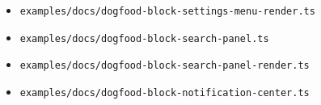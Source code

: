 \begin{itemize}
\begin{itemize}
  \item
    \texttt{e\allowbreak{}x\allowbreak{}a\allowbreak{}m\allowbreak{}p\allowbreak{}l\allowbreak{}e\allowbreak{}s\allowbreak{}/\allowbreak{}d\allowbreak{}o\allowbreak{}c\allowbreak{}s\allowbreak{}/\allowbreak{}d\allowbreak{}o\allowbreak{}g\allowbreak{}f\allowbreak{}o\allowbreak{}o\allowbreak{}d\allowbreak{}-\allowbreak{}b\allowbreak{}l\allowbreak{}o\allowbreak{}c\allowbreak{}k\allowbreak{}-\allowbreak{}s\allowbreak{}e\allowbreak{}t\allowbreak{}t\allowbreak{}i\allowbreak{}n\allowbreak{}g\allowbreak{}s\allowbreak{}-\allowbreak{}m\allowbreak{}e\allowbreak{}n\allowbreak{}u\allowbreak{}-\allowbreak{}r\allowbreak{}e\allowbreak{}n\allowbreak{}d\allowbreak{}e\allowbreak{}r\allowbreak{}.\allowbreak{}t\allowbreak{}s}
  \item
    \texttt{e\allowbreak{}x\allowbreak{}a\allowbreak{}m\allowbreak{}p\allowbreak{}l\allowbreak{}e\allowbreak{}s\allowbreak{}/\allowbreak{}d\allowbreak{}o\allowbreak{}c\allowbreak{}s\allowbreak{}/\allowbreak{}d\allowbreak{}o\allowbreak{}g\allowbreak{}f\allowbreak{}o\allowbreak{}o\allowbreak{}d\allowbreak{}-\allowbreak{}b\allowbreak{}l\allowbreak{}o\allowbreak{}c\allowbreak{}k\allowbreak{}-\allowbreak{}s\allowbreak{}e\allowbreak{}a\allowbreak{}r\allowbreak{}c\allowbreak{}h\allowbreak{}-\allowbreak{}p\allowbreak{}a\allowbreak{}n\allowbreak{}e\allowbreak{}l\allowbreak{}.\allowbreak{}t\allowbreak{}s}
  \item
    \texttt{e\allowbreak{}x\allowbreak{}a\allowbreak{}m\allowbreak{}p\allowbreak{}l\allowbreak{}e\allowbreak{}s\allowbreak{}/\allowbreak{}d\allowbreak{}o\allowbreak{}c\allowbreak{}s\allowbreak{}/\allowbreak{}d\allowbreak{}o\allowbreak{}g\allowbreak{}f\allowbreak{}o\allowbreak{}o\allowbreak{}d\allowbreak{}-\allowbreak{}b\allowbreak{}l\allowbreak{}o\allowbreak{}c\allowbreak{}k\allowbreak{}-\allowbreak{}s\allowbreak{}e\allowbreak{}a\allowbreak{}r\allowbreak{}c\allowbreak{}h\allowbreak{}-\allowbreak{}p\allowbreak{}a\allowbreak{}n\allowbreak{}e\allowbreak{}l\allowbreak{}-\allowbreak{}r\allowbreak{}e\allowbreak{}n\allowbreak{}d\allowbreak{}e\allowbreak{}r\allowbreak{}.\allowbreak{}t\allowbreak{}s}
  \item
    \texttt{e\allowbreak{}x\allowbreak{}a\allowbreak{}m\allowbreak{}p\allowbreak{}l\allowbreak{}e\allowbreak{}s\allowbreak{}/\allowbreak{}d\allowbreak{}o\allowbreak{}c\allowbreak{}s\allowbreak{}/\allowbreak{}d\allowbreak{}o\allowbreak{}g\allowbreak{}f\allowbreak{}o\allowbreak{}o\allowbreak{}d\allowbreak{}-\allowbreak{}b\allowbreak{}l\allowbreak{}o\allowbreak{}c\allowbreak{}k\allowbreak{}-\allowbreak{}n\allowbreak{}o\allowbreak{}t\allowbreak{}i\allowbreak{}f\allowbreak{}i\allowbreak{}c\allowbreak{}a\allowbreak{}t\allowbreak{}i\allowbreak{}o\allowbreak{}n\allowbreak{}-\allowbreak{}c\allowbreak{}e\allowbreak{}n\allowbreak{}t\allowbreak{}e\allowbreak{}r\allowbreak{}.\allowbreak{}t\allowbreak{}s}

\end{itemize}
\end{itemize}
